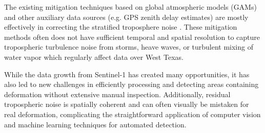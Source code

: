 The existing mitigation techniques based on global atmospheric models (GAMs) and other auxiliary data sources (e.g. GPS zenith delay estimates) are mostly effectively in correcting the stratified troposphere noise \citep{Lauknes2011InsarTroposphericStratification, Bekaert2015SpatiallyVariablePower, Doin2009CorrectionsStratifiedTropospheric, Li2005InterferometricSyntheticAperture,Ding2008AtmosphericEffectsInsar}. These mitigation methods often does not have sufficient temporal and spatial resolution to capture tropospheric turbulence noise from storms, heave waves, or turbulent mixing of water vapor which regularly affect data over West Texas.

While the data growth from Sentinel-1 has created many opportunities, it has also led to new challenges in efficiently processing and detecting areas containing deformation without extensive manual inspection.
Additionally, residual tropospheric noise is spatially coherent and can often visually be mistaken for real deformation, complicating the straightforward application of computer vision and machine learning techniques for automated detection.
